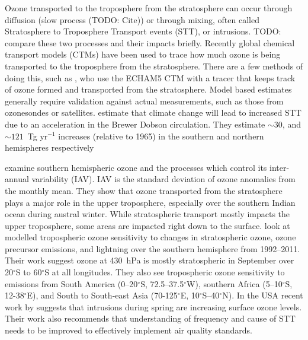    Ozone transported to the troposphere from the stratosphere can occur through diffusion (slow process (TODO: Cite)) or through mixing, often called Stratosphere to Troposphere Transport events (STT), or intrusions.
    TODO: compare these two processes and their impacts briefly.
    Recently global chemical transport models (CTMs) have been used to trace how much ozone is being transported to the troposphere from the stratosphere.
    There are a few methods of doing this, such as \cite{Ojha2016}, who use the ECHAM5 CTM with a tracer that keeps track of ozone formed and transported from the stratosphere.
    Model based estimates generally require validation against actual measurements, such as those from ozonesondes or satellites.
    \cite{Hegglin2009} estimate that climate change will lead to increased STT due to an acceleration in the Brewer Dobson circulation.
    They estimate $\sim 30$, and $\sim 121$~Tg yr$^{-1}$ increases (relative to 1965) in the southern and northern hemispheres respectively
    
    \cite{Liu2017} examine southern hemispheric ozone and the processes which control its inter-annual variability (IAV).
    IAV is the standard deviation of ozone anomalies from the monthly mean.
    They show that ozone transported from the stratosphere plays a major role in the upper troposphere, especially over the southern Indian ocean during austral winter.
    While stratospheric transport mostly impacts the upper troposphere, some areas are impacted right down to the surface.
    \cite{Liu2017} look at modelled tropospheric ozone sensitivity to changes in stratospheric ozone, ozone precursor emissions, and lightning over the southern hemisphere from 1992--2011. 
    Their work suggest ozone at 430~hPa is mostly stratospheric in September over 20$^{\circ}$S to 60$^{\circ}$S at all longitudes.
    They also see tropospheric ozone sensitivity to emissions from South America (0--20$^{\circ}$S, 72.5--37.5$^{\circ}$W), southern Africa (5--10$^{\circ}$S, 12-38$^{\circ}$E), and South to South-east Asia (70-125$^{\circ}$E, 10$^{\circ}$S--40$^{\circ}$N).
    In the USA recent work by \cite{Lin2015} suggests that intrusions during spring are increasing surface ozone levels.
    Their work also recommends that understanding of frequency and cause of STT needs to be improved to effectively implement air quality standards.
    
